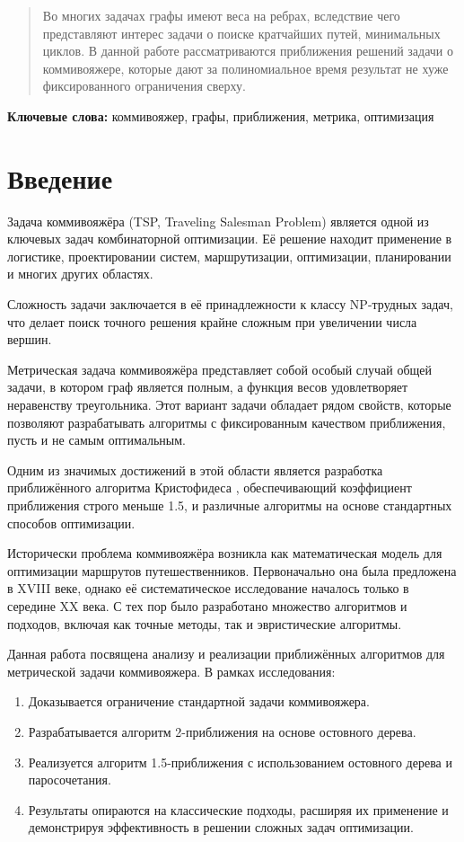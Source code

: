 
\begin{abstract}
    Во многих задачах графы имеют веса на ребрах, вследствие чего представляют интерес задачи о поиске кратчайших путей, минимальных циклов.
    В данной работе рассматриваются приближения решений задачи о коммивояжере, которые дают за полиномиальное время результат не хуже фиксированного ограничения сверху.
\end{abstract}
\begin{center}
    \textbf{Ключевые слова:} коммивояжер, графы, приближения, метрика, оптимизация
\end{center}

\section{Введение}

Задача коммивояжёра (TSP, Traveling Salesman Problem) является одной из ключевых задач комбинаторной оптимизации.
Её решение находит применение в логистике, проектировании систем, маршрутизации, оптимизации, 
планировании и многих других областях. 

Сложность задачи заключается в её принадлежности к классу NP-трудных задач, 
что делает поиск точного решения крайне сложным при увеличении числа вершин.

Метрическая задача коммивояжёра представляет собой особый случай общей задачи, в котором граф является полным, 
а функция весов удовлетворяет неравенству треугольника. 
Этот вариант задачи обладает рядом свойств, которые позволяют разрабатывать алгоритмы с фиксированным качеством приближения,
пусть и не самым оптимальным.

Одним из значимых достижений в этой области является разработка приближённого алгоритма Кристофидеса \cite{christofides1976},
обеспечивающий коэффициент приближения строго меньше 1.5, и различные алгоритмы на основе стандартных способов оптимизации.

Исторически проблема коммивояжёра возникла как математическая модель для оптимизации маршрутов путешественников. 
Первоначально она была предложена в XVIII веке, 
однако её систематическое исследование началось только в середине XX века. 
С тех пор было разработано множество алгоритмов и подходов, включая как точные методы, так и эвристические алгоритмы.

Данная работа посвящена анализу и реализации приближённых алгоритмов для метрической задачи коммивояжера.
В рамках исследования:
\begin{enumerate}
    \item Доказывается ограничение стандартной задачи коммивояжера.
    \item Разрабатывается алгоритм 2-приближения на основе остовного дерева.
    \item Реализуется алгоритм 1.5-приближения с использованием остовного дерева и паросочетания.
    \item Результаты опираются на классические подходы, расширяя их применение и демонстрируя эффективность в решении сложных задач оптимизации.
\end{enumerate}

